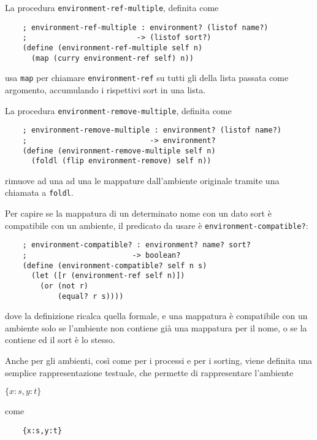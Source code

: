 La procedura \lstinline{environment-ref-multiple}, definita come

\begin{lstlisting}
    ; environment-ref-multiple : environment? (listof name?)
    ;                         -> (listof sort?)
    (define (environment-ref-multiple self n)
      (map (curry environment-ref self) n))
\end{lstlisting}

usa \lstinline{map} per chiamare \lstinline{environment-ref} su tutti gli
della lista passata come argomento, accumulando i rispettivi sort in una
lista.

La procedura \lstinline{environment-remove-multiple}, definita come

\begin{lstlisting}
    ; environment-remove-multiple : environment? (listof name?)
    ;                            -> environment?
    (define (environment-remove-multiple self n)
      (foldl (flip environment-remove) self n))
\end{lstlisting}

rimuove ad una ad una le mappature dall'ambiente originale tramite una
chiamata a \lstinline{foldl}.

Per capire se la mappatura di un determinato nome con un dato sort \`e
compatibile con un ambiente, il predicato da usare \`e
\lstinline{environment-compatible?}:

\begin{lstlisting}
    ; environment-compatible? : environment? name? sort?
    ;                        -> boolean?
    (define (environment-compatible? self n s)
      (let ([r (environment-ref self n)])
        (or (not r)
            (equal? r s))))
\end{lstlisting}

dove la definizione ricalca quella formale, e una mappatura \`e
compatibile con un ambiente solo se l'ambiente non contiene gi\`a una
mappatura per il nome, o se la contiene ed il sort \`e lo stesso.

Anche per gli ambienti, cos\`i come per i processi e per i sorting,
viene definita una semplice rappresentazione testuale, che permette di
rappresentare l'ambiente

\begin{pilisting}
$
    \{x:s,y:t\}
$
\end{pilisting}

come

\begin{lstlisting}
    {x:s,y:t}
\end{lstlisting}

